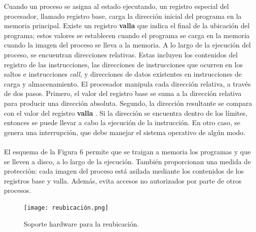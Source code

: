 \documentclass[12pt,a4paper]{article}
\begin{document}
Cuando un proceso se asigna al estado ejecutando, un registro especial del procesador, llamado registro base, carga la dirección inicial del programa en la memoria principal. Existe un registro \textbf{valla} que indica el final de la ubicación del programa; estos valores se establecen cuando el programa se carga en la memoria cuando la imagen del proceso se lleva a la memoria. A lo largo de la ejecución del proceso, se encuentran direcciones relativas. Estas incluyen los contenidos del registro de las instrucciones, las direcciones de instrucciones que ocurren en los saltos e instrucciones \textit{call}, y direcciones de datos existentes en instrucciones de carga y almacenamiento. El procesador manipula cada dirección relativa, a través de dos pasos. Primero, el valor del registro base se suma a la dirección relativa para producir una dirección absoluta. Segundo, la dirección resultante se compara con el valor del registro \textbf{valla} . Si la dirección se encuentra dentro de los límites, entonces se puede llevar a cabo la ejecución de la instrucción. En otro caso, se genera una interrupción, que debe manejar el sistema operativo de algún modo. \\\\ 
El esquema de la Figura 6 permite que se traigan a memoria los programas y que se lleven a disco, a lo largo de la ejecución. También proporcionan una medida de protección: cada imagen del proceso está asilada mediante los contenidos de los registros base y valla. Además, evita accesos no autorizados por parte de otros procesos.
\begin{figure}[H]
    \centering
    \texttt{[image: reubicación.png]}
    \caption{Soporte hardware para la reubicación.}
\end{figure}
\end{document}
